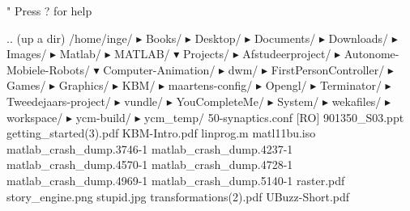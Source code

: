 " Press ? for help

.. (up a dir)
/home/inge/
▸ Books/
▸ Desktop/
▸ Documents/
▸ Downloads/
▸ Images/
▸ Matlab/
▸ MATLAB/
▾ Projects/
  ▸ Afstudeerproject/
  ▸ Autonome-Mobiele-Robots/
  ▾ Computer-Animation/
  ▸ dwm/
  ▸ FirstPersonController/
  ▸ Games/
  ▸ Graphics/
  ▸ KBM/
  ▸ maartens-config/
  ▸ Opengl/
  ▸ Terminator/
  ▸ Tweedejaars-project/
  ▸ vundle/
  ▸ YouCompleteMe/
▸ System/
▸ wekafiles/
▸ workspace/
▸ ycm-build/
▸ ycm_temp/
  50-synaptics.conf [RO]
  901350_S03.ppt
  getting_started(3).pdf
  KBM-Intro.pdf
  linprog.m
  matl11bu.iso
  matlab_crash_dump.3746-1
  matlab_crash_dump.4237-1
  matlab_crash_dump.4570-1
  matlab_crash_dump.4728-1
  matlab_crash_dump.4969-1
  matlab_crash_dump.5140-1
  raster.pdf
  story_engine.png
  stupid.jpg
  transformations(2).pdf
  UBuzz-Short.pdf

